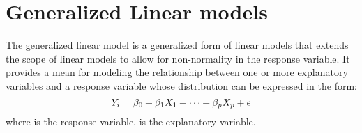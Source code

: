 \section{Generalized Linear models}
The generalized linear model is a generalized form of linear models that extends the scope of linear models to allow for non-normality in the response variable. It provides a mean for modeling the relationship between one or more explanatory variables and a response variable whose distribution can be expressed in the form: 
\begin{equation}
	\centering
	\label{eqn:GLM}
	Y_i =\beta_0 + \beta_1 X_1 + \cdots + \beta_{p}X_{p} + \epsilon
\end{equation}
where  is the response variable,  is the explanatory variable.


